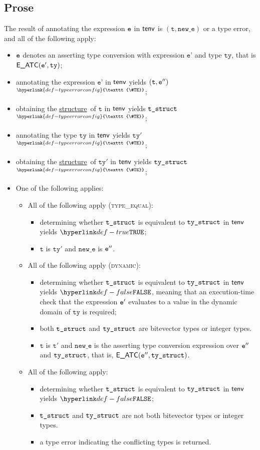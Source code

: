 \documentclass{book}
\newcommand\TypeErrorConfig[0]{\hyperlink{def-typeerrorconfig}{\texttt{\#TE}}}
\newcommand\ProseOrTypeError[0]{\hyperlink{def-proseortypeerror}{$^{\TypeErrorConfig}$}}
\newcommand\structure[0]{\hyperlink{def-structure}{structure}}
\newcommand\vt[0]{\texttt{t}}
\newcommand\tty[0]{\texttt{ty}}
\newcommand\newe[0]{\texttt{new\_e}}
\newcommand\vep[0]{\texttt{e'}}
\begin{document}
\subsection{Prose}
The result of annotating the expression $\texttt{e}$ in $\textsf{tenv}$ is
$(\vt, \newe)$ or a type error, and all of the following apply:
  \begin{itemize}
  \item $\texttt{e}$ denotes an asserting type conversion with expression $\vep$ and type $\tty$, that is $\EATC(\ve', \tty)$;
  \item annotating the expression $\vep$ in $\textsf{tenv}$ yields $(\vt, \ve'')$ \ProseOrTypeError;
  \item obtaining the \structure\ of $\vt$ in $\textsf{tenv}$ yields $\texttt{t\_struct}$ \ProseOrTypeError;
  \item annotating the type $\tty$ in $\textsf{tenv}$ yields $\tty'$ \ProseOrTypeError;
  \item obtaining the \structure\ of $\tty'$ in $\textsf{tenv}$ yields $\texttt{ty\_struct}$ \ProseOrTypeError;
  \item One of the following applies:
    \begin{itemize}
    \item All of the following apply (\textsc{type\_equal}):
    \begin{itemize}
      \item determining whether $\texttt{t\_struct}$ is equivalent to $\texttt{ty\_struct}$ in $\textsf{tenv}$ \\ yields $\True$;
      \item $\vt$ is $\tty'$ and $\newe$ is $\texttt{e}''$.
    \end{itemize}
    \item All of the following apply (\textsc{dynamic}):
      \begin{itemize}
        \item determining whether $\texttt{t\_struct}$ is equivalent to $\texttt{ty\_struct}$ in $\textsf{tenv}$ \\ yields $\False$,
        meaning that an execution-time check that the expression $\texttt{e}'$ evaluates to a value in the
        dynamic domain of $\tty$ is required;
        \item both $\texttt{t\_struct}$ and $\texttt{ty\_struct}$ are bitevector types or integer types.
        \item $\vt$ is $\vt'$ and $\newe$ is the asserting type conversion expression over $\texttt{e}''$ \\ and
        $\texttt{ty\_struct}$, that is, $\textsf{E\_ATC}(\texttt{e}'', \texttt{ty\_struct})$.
     \end{itemize}
   \item All of the following apply:
     \begin{itemize}
      \item determining whether $\texttt{t\_struct}$ is equivalent to $\texttt{ty\_struct}$ in $\textsf{tenv}$ \\ yields $\False$;
      \item $\texttt{t\_struct}$ and $\texttt{ty\_struct}$ are not both bitevector types or integer types.
      \item a type error indicating the conflicting types is returned.
     \end{itemize}
   \end{itemize}
  \end{itemize}
\end{document}
